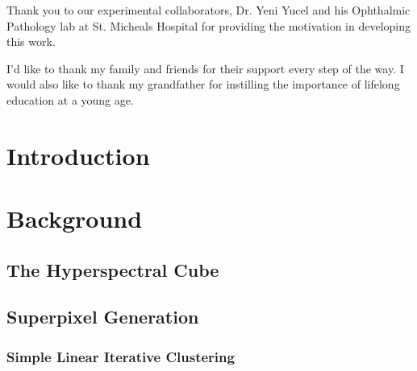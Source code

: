 \documentclass[10pt]{article}
\begin{document}
Thank you to our experimental collaborators, Dr. Yeni Yucel and his Ophthalmic Pathology lab at St. Micheals Hospital for providing the motivation in developing this work. 

I’d like to thank my family and friends for their support every step of the way. I would also like to thank my grandfather for instilling the importance of lifelong education at a young age.  
\clearpage



\tableofcontents

\clearpage
% 
% 
% 
% 
% 
\section{Introduction}

% 

\clearpage
% 
% 
% 
% 
% 
\section{Background} \label{Background}

% 
\subsection{The Hyperspectral Cube} \label{Cube}


\subsection{Superpixel Generation} \label{Superpixel}

\subsubsection{Simple Linear Iterative Clustering} \label{SLIC}

\end{document}
